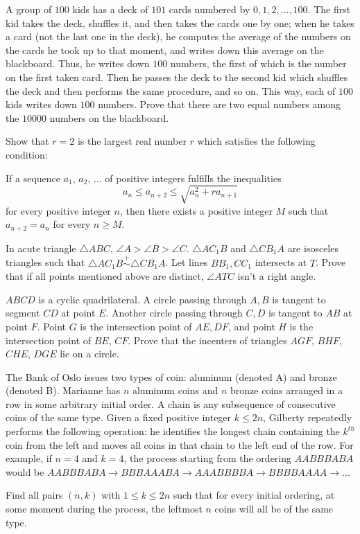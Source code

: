\documentclass[11pt]{scrartcl}
\begin{document}
\begin{problem}[4000488814786935591]
A group of $100$ kids has a deck of $101$ cards numbered by $0, 1, 2,\dots, 100$. The first kid takes the deck, shuffles it, and then takes the cards one by one; when he takes a card (not the last one in the deck), he computes the average of the numbers on the cards he took up to that moment, and writes down this average on the blackboard. Thus, he writes down $100$ numbers, the first of which is the number on the first taken card. Then he passes the deck to the second kid which shuffles the deck and then performs the same procedure, and so on. This way, each of $100$ kids writes down $100$ numbers. Prove that there are two equal numbers among the $10000$ numbers on the blackboard.
\end{problem}
\begin{problem}[543318535845123]
Show that $r = 2$ is the largest real number $r$ which satisfies the following condition:

If a sequence $a_1$, $a_2$, $\ldots$ of positive integers fulfills the inequalities
\[a_n \leq a_{n+2} \leq\sqrt{a_n^2+ra_{n+1}}\]for every positive integer $n$, then there exists a positive integer $M$ such that $a_{n+2} = a_n$ for every $n \geq M$.
\end{problem}
\begin{problem}[8534263250311217423]
	In acute triangle $\triangle {ABC}$, $\angle 
A > \angle B > \angle C$. $\triangle {AC_1B}$ and $\triangle {CB_1A}$ are isosceles triangles such that $\triangle {AC_1B} \stackrel{+}{\sim}  \triangle {CB_1A}$. Let lines $BB_1, CC_1$ intersects at ${T}$. Prove that if all points mentioned above are distinct, $\angle ATC$ isn't a right angle.
\end{problem}
\begin{problem}[2040194717643782420]
	$ABCD$ is a cyclic quadrilateral. A circle passing through $A,B$ is tangent to segment $CD$ at point $E$. Another circle passing through $C,D$ is tangent to $AB$ at point $F$. Point $G$ is the intersection point of $AE,DF$, and point $H$ is the intersection point of $BE$, $CF$. Prove that the incenters of triangles $AGF$, $BHF$, $CHE$, $DGE$ lie on a circle.
\end{problem}
\begin{problem}[587866144613888]
The Bank of Oslo issues two types of coin: aluminum (denoted A) and bronze (denoted B). Marianne has $n$ aluminum coins and $n$ bronze coins arranged in a row in some arbitrary initial order. A chain is any subsequence of consecutive coins of the same type. Given a fixed positive integer $k \leq 2n$, Gilberty repeatedly performs the following operation: he identifies the longest chain containing the $k^{th}$ coin from the left and moves all coins in that chain to the left end of the row. For example, if $n=4$ and $k=4$, the process starting from the ordering $AABBBABA$ would be $AABBBABA \to BBBAAABA \to AAABBBBA \to BBBBAAAA \to ...$

Find all pairs $(n,k)$ with $1 \leq k \leq 2n$ such that for every initial ordering, at some moment during the process, the leftmost $n$ coins will all be of the same type.
\end{problem}
\end{document}
